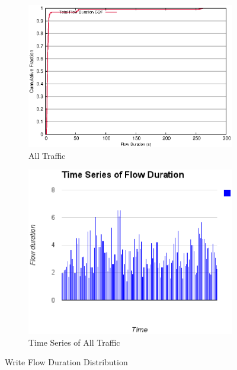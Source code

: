 \begin{figure}[!htbp]
\begin{subfigure}[b]{.45\linewidth}
	\includegraphics[width=.99\textwidth]{figures/6writes/flow_duration.eps}
	\caption{All Traffic}\label{fig:write_duration:all}
   \end{subfigure}%
  \begin{subfigure}[b]{.45\linewidth}
   \centering
	\includegraphics[width=.99\textwidth]{figures/6writes/flow_duration_time_series.eps}
	\caption{Time Series of All Traffic}\label{fig:write:time_series}
   \end{subfigure}%
\caption{Write Flow Duration Distribution}
\label{fig:write_duration}
\end{figure}


